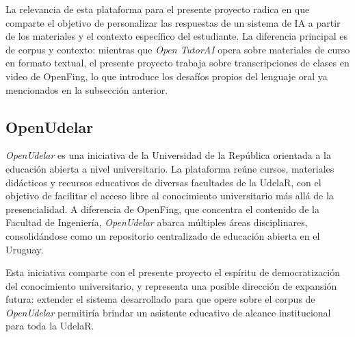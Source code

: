 La relevancia de esta plataforma para el presente proyecto radica en que comparte el objetivo de personalizar las respuestas de un sistema de IA a partir de los materiales y el contexto específico del estudiante. La diferencia principal es de corpus y contexto: mientras que \textit{Open TutorAI} opera sobre materiales de curso en formato textual, el presente proyecto trabaja sobre transcripciones de clases en video de OpenFing, lo que introduce los desafíos propios del lenguaje oral ya mencionados en la subsección anterior.

\subsection{OpenUdelar}
\label{subsection:2-OpenUdelar}

\textit{OpenUdelar} es una iniciativa de la Universidad de la República orientada a la educación abierta a nivel universitario. La plataforma reúne cursos, materiales didácticos y recursos educativos de diversas facultades de la UdelaR, con el objetivo de facilitar el acceso libre al conocimiento universitario más allá de la presencialidad. A diferencia de OpenFing, que concentra el contenido de la Facultad de Ingeniería, \textit{OpenUdelar} abarca múltiples áreas disciplinares, consolidándose como un repositorio centralizado de educación abierta en el Uruguay.

Esta iniciativa comparte con el presente proyecto el espíritu de democratización del conocimiento universitario, y representa una posible dirección de expansión futura: extender el sistema desarrollado para que opere sobre el corpus de \textit{OpenUdelar} permitiría brindar un asistente educativo de alcance institucional para toda la UdelaR.
